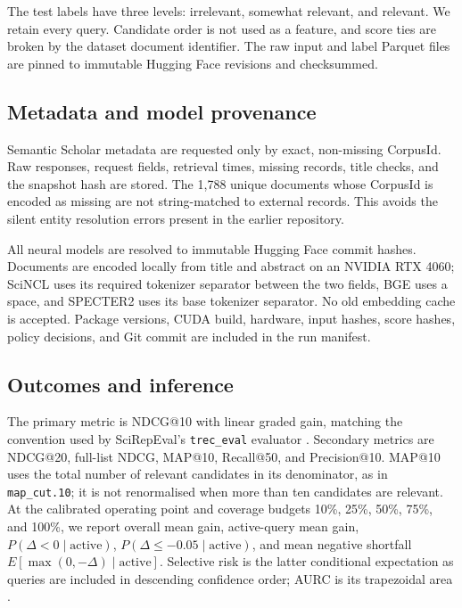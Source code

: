 \documentclass[11pt]{article}
\newcommand{\code}[1]{\texttt{#1}}
\begin{document}
The test labels have three levels: irrelevant, somewhat relevant, and relevant.  We
retain every query.  Candidate order is not used as a feature, and score ties are
broken by the dataset document identifier.  The raw input and label Parquet files are
pinned to immutable Hugging Face revisions and checksummed.

\subsection{Metadata and model provenance}

Semantic Scholar metadata are requested only by exact, non-missing CorpusId.  Raw
responses, request fields, retrieval times, missing records, title checks, and the
snapshot hash are stored.  The 1,788 unique documents whose CorpusId is encoded as
missing are not string-matched to external records.  This avoids the silent entity
resolution errors present in the earlier repository.

All neural models are resolved to immutable Hugging Face commit hashes.  Documents
are encoded locally from title and abstract on an NVIDIA RTX 4060; SciNCL uses its
required tokenizer separator between the two fields, BGE uses a space, and SPECTER2
uses its base tokenizer separator.  No old embedding
cache is accepted.  Package versions, CUDA build, hardware, input hashes, score
hashes, policy decisions, and Git commit are included in the run manifest.

\subsection{Outcomes and inference}

The primary metric is NDCG@10 with linear graded gain, matching the convention used
by SciRepEval's \code{trec\_eval} evaluator \citep{jarvelin2002}.  Secondary
metrics are NDCG@20, full-list NDCG, MAP@10, Recall@50, and Precision@10.  MAP@10
uses the total number of relevant candidates in its denominator, as in
\code{map\_cut.10}; it is not renormalised when more than ten candidates are relevant.
At the calibrated operating point and coverage
budgets 10\%, 25\%, 50\%, 75\%, and 100\%, we report overall mean gain, active-query
mean gain, \(P(\Delta<0\mid\mathrm{active})\),
\(P(\Delta\le -0.05\mid\mathrm{active})\), and mean negative shortfall
\(E[\max(0,-\Delta)\mid\mathrm{active}]\).  Selective risk is the latter conditional
expectation as queries are included in descending confidence order; AURC is its
trapezoidal area \citep{zhou2025aurc}.
\end{document}
